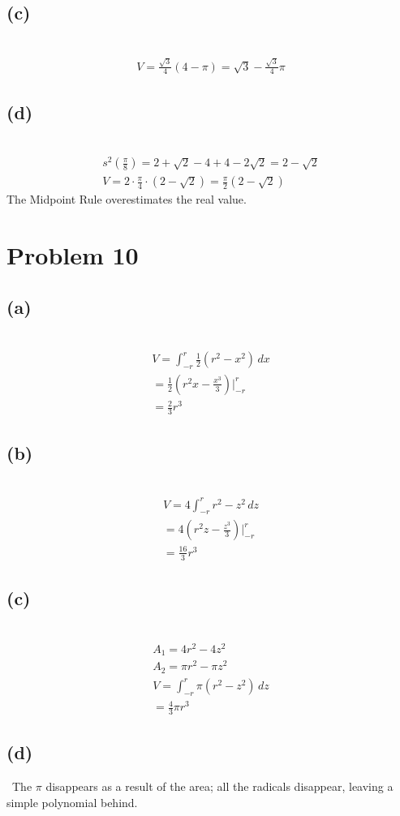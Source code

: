\documentclass[12pt]{article}
\newcommand{\problem}[1]{\section{Problem #1}}
\newcommand{\subproblem}[1]{\subsection{(#1)} \,}
\begin{document}
\subproblem{c}
\begin{gather*}
    V= \frac{\sqrt{3}}{4}(4-\pi )= \boxed{\sqrt{3}- \frac{\sqrt{3}}{4}\pi}
\end{gather*}

\subproblem{d}
\begin{gather*}
    s^2(\frac{\pi}{8})= 2+\sqrt{2}-4+4-2\sqrt{2}=2-\sqrt{2}\\
    V=2\cdot \frac{\pi}{4}\cdot (2-\sqrt{2})= \boxed{ \frac{\pi}{2}(2-\sqrt{2})}
\end{gather*}
The Midpoint Rule overestimates the real value.

\problem{10}

\subproblem{a}
\begin{gather*}
    V=\int_{-r}^r \frac{1}{2}(r^2-x^2) \, dx\\
    =\frac{1}{2}(r^2x - \frac{x^3}{3}) \Big|_{-r}^r\\
    =\boxed{\frac{2}{3}r^3}
\end{gather*}

\subproblem{b}
\begin{gather*}
    V=4\int_{-r}^r r^2-z^2\, dz\\
    = 4(r^2z - \frac{z^3}{3})\Big|_{-r}^r\\
    = \boxed{\frac{16}{3}r^3}
\end{gather*}

\subproblem{c}
\begin{gather*}
    A_1=4r^2-4z^2\\
    A_2=\pi r^2-\pi z^2\\
    V=\int_{-r}^r \pi (r^2-z^2)\, dz\\
    = \boxed{\frac{4}{3}\pi r^3}
\end{gather*}

\subproblem{d}
The $\pi$ disappears as a result of the area; all the radicals disappear, leaving a simple polynomial behind. 
\end{document}
